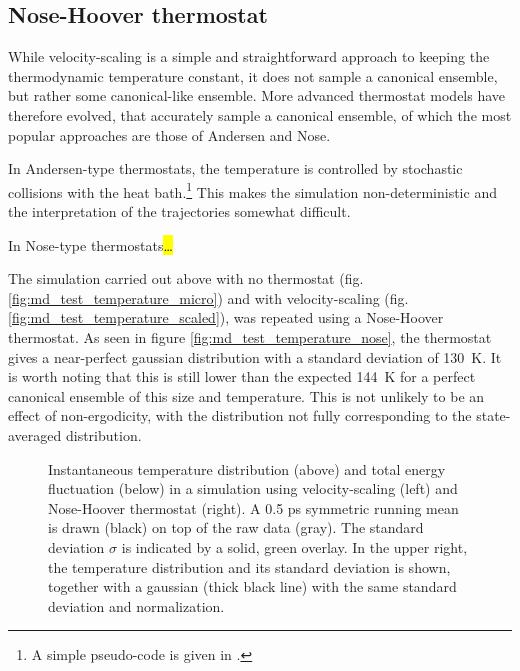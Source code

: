 \documentclass[11pt,bibliography=totoc,index=totoc]{scrbook}   %
\newcommand{\comment}[1]{\hl{#1}}
\begin{document}
%
\subsection{Nose-Hoover thermostat}\label{sec:nose-hoover}
%

While velocity-scaling is a simple and straightforward approach to keeping the thermodynamic temperature constant, it does not sample a canonical ensemble, but rather some canonical-like ensemble. 
More advanced thermostat models have therefore evolved, that accurately sample a canonical ensemble, of which the most popular approaches are those of Andersen\cite{Andersen:1980} and Nose\cite{Nose:1984,Nose:1991,Bylander:1992}.

In Andersen-type thermostats, the temperature is controlled by stochastic collisions with the heat bath.\footnote{
A simple pseudo-code is given in \cite[129]{Frenkel:1996}.}
This makes the simulation non-deterministic and the interpretation of the trajectories somewhat difficult.

In Nose-type thermostats\comment{\ldots}

The simulation carried out above with no thermostat (fig. \ref{fig:md_test_temperature_micro}) and with
velocity-scaling (fig. \ref{fig:md_test_temperature_scaled}), was repeated using a Nose-Hoover thermostat.
As seen in figure \ref{fig:md_test_temperature_nose}, the thermostat gives a near-perfect gaussian distribution with a standard deviation of 130~K. 
It is worth noting that this is still lower than the expected 144~K for a perfect canonical ensemble of this size and temperature. 
This is not unlikely to be an effect of non-ergodicity, with the distribution not fully corresponding to the state-averaged distribution. 


\begin{figure}[htbp]
  \centering
  \caption{
    Instantaneous temperature distribution (above) and total energy fluctuation (below) 
    in a simulation using velocity-scaling (left) and Nose-Hoover thermostat (right). 
    A 0.5 ps symmetric running mean is drawn (black) on top of the raw data (gray). 
    The standard deviation $\sigma$ is indicated by a solid, green overlay. 
    In the upper right, the temperature distribution and its standard deviation is shown, 
    together with a gaussian (thick black line) with the same standard deviation and normalization.
   }
  \label{fig:md_test_temperature}
\end{figure}
\end{document}
